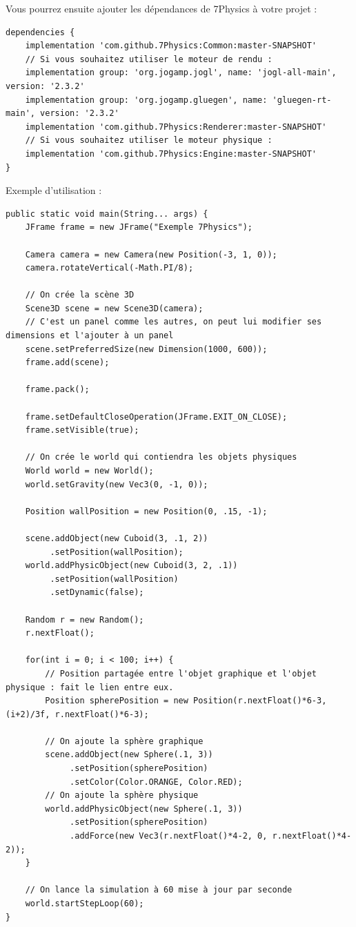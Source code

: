 \documentclass[11pt]{report}
\begin{document}
Vous pourrez ensuite ajouter les dépendances de 7Physics à votre projet :

\begin{verbatim}
dependencies {
    implementation 'com.github.7Physics:Common:master-SNAPSHOT'
    // Si vous souhaitez utiliser le moteur de rendu :
    implementation group: 'org.jogamp.jogl', name: 'jogl-all-main', version: '2.3.2'
    implementation group: 'org.jogamp.gluegen', name: 'gluegen-rt-main', version: '2.3.2'
    implementation 'com.github.7Physics:Renderer:master-SNAPSHOT'
    // Si vous souhaitez utiliser le moteur physique :
    implementation 'com.github.7Physics:Engine:master-SNAPSHOT'
}
\end{verbatim}


Exemple d'utilisation :

\begin{verbatim}
public static void main(String... args) {
    JFrame frame = new JFrame("Exemple 7Physics");

    Camera camera = new Camera(new Position(-3, 1, 0));
    camera.rotateVertical(-Math.PI/8);

    // On crée la scène 3D
    Scene3D scene = new Scene3D(camera);
    // C'est un panel comme les autres, on peut lui modifier ses dimensions et l'ajouter à un panel
    scene.setPreferredSize(new Dimension(1000, 600));
    frame.add(scene);

    frame.pack();

    frame.setDefaultCloseOperation(JFrame.EXIT_ON_CLOSE);
    frame.setVisible(true);

    // On crée le world qui contiendra les objets physiques
    World world = new World();
    world.setGravity(new Vec3(0, -1, 0));

    Position wallPosition = new Position(0, .15, -1);

    scene.addObject(new Cuboid(3, .1, 2))
         .setPosition(wallPosition);
    world.addPhysicObject(new Cuboid(3, 2, .1))
         .setPosition(wallPosition)
         .setDynamic(false);

    Random r = new Random();
    r.nextFloat();

    for(int i = 0; i < 100; i++) {
        // Position partagée entre l'objet graphique et l'objet physique : fait le lien entre eux.
        Position spherePosition = new Position(r.nextFloat()*6-3, (i+2)/3f, r.nextFloat()*6-3);

        // On ajoute la sphère graphique
        scene.addObject(new Sphere(.1, 3))
             .setPosition(spherePosition)
             .setColor(Color.ORANGE, Color.RED);
        // On ajoute la sphère physique
        world.addPhysicObject(new Sphere(.1, 3))
             .setPosition(spherePosition)
             .addForce(new Vec3(r.nextFloat()*4-2, 0, r.nextFloat()*4-2));
    }

    // On lance la simulation à 60 mise à jour par seconde
    world.startStepLoop(60);
}

\end{verbatim}
\end{document}

